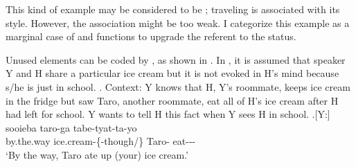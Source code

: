 This kind of example may be considered to be ;
traveling is associated with its style.
However, the association might be too weak.
I categorize this example as a marginal case of 
and  functions to upgrade the referent to the  status.

Unused elements can be coded by ,
as shown in \Next.
In \Next,
it is assumed that speaker Y and  H share a particular ice cream
but it is not evoked in H's mind
because s/he is just in school.
%
\ex. \label{aisuT}Context: Y knows that H, Y's roommate, keeps ice cream in the fridge
	but saw Taro, another roommate, eat all of H's ice cream after H had left for school.
	Y wants to tell H this fact when Y sees H in school.
	\ag.[Y:] sooieba  taro-ga tabe-tyat-ta-yo \\
		by.the.way ice.cream-\{-though/\} Taro- eat--- \\
		`By the way, Taro ate up (your) ice cream.'


%		


